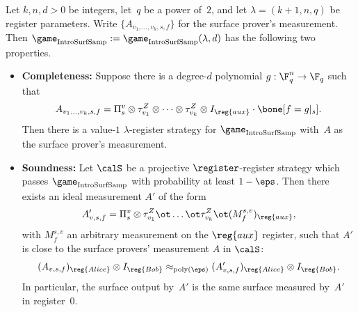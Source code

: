 \begin{theorem}\label{thm:big-planes}
Let $k, n, d>0$ be integers, let~$q$ be a power of~$2$,
and let $\lambda = (k+1, n, q)$ be register parameters.
Write $\{A_{v_1, \ldots, v_k, s, f}\}$ for the surface prover's measurement.
Then $\game_{\mathrm{IntroSurfSamp}} := \game_{\mathrm{IntroSurfSamp}}(\lambda, d)$ has the following two properties.
  \begin{itemize}
  \item[$\circ$] \textbf{Completeness:}
    		Suppose there is a degree-$d$ polynomial $g:\F_q^{n}\rightarrow \F_q$ such that
		\begin{equation*}
			A_{v_1 \ldots, v_k,s,f} = \Pi^{v}_s \otimes \tau^Z_{v_1} \otimes
                        \cdots \otimes \tau^{Z}_{v_k} \otimes I_{\reg{aux}} \cdot \bone[f = g|_{s}].
		\end{equation*}
		Then there is a value-$1$ $\lambda$-register strategy
                for $\game_{\mathrm{IntroSurfSamp}}$ with~$A$ as the
                surface prover's measurement.
  \item[$\circ$]\textbf{Soundness:}
Let $\calS$ be a projective $\register$-register strategy which passes $\game_{\mathrm{IntroSurfSamp}}$ with probability at least $1-\eps$.
Then there exists an ideal measurement $A'$ of the form
\[ A'_{v, s, f} =\Pi^v_s \otimes  \tau^Z_{v_1} \ot
  \dots \ot \tau^Z_{v_k} \ot 
    (M^{s,v}_{f})_{\reg{aux}}, \]
with $M^{s, v}_{f}$ an arbitrary measurement on the
$\reg{aux}$ register, such that $A'$ is close to the surface provers'
measurement $A$ in $\calS$:
\begin{equation*}
(A_{v, s, f})_{\reg{Alice}} \otimes I_{\reg{Bob}}
\approx_{\mathrm{poly}(\eps)} (A'_{v,
  s, f})_{\reg{Alice}} \otimes I_{\reg{Bob}}.
\end{equation*}
In particular, the surface output by~$A'$ is the same surface measured by~$A'$ in register~$0$.
\end{itemize}
\end{theorem}


